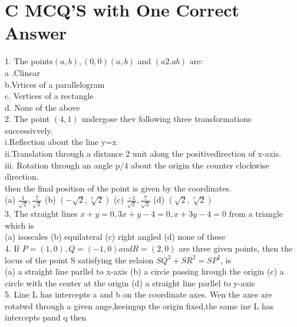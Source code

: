 \documentclass[12pt]{article}
\begin{document}
\section*{C   MCQ'S with One Correct Answer}

1. 	The points$(a,b),(0,0)(a,b)$ and $(a2.ab)$ are:\\
a .Clinear\\
b.Vrtices of a parallelogram\\
c. Vertices of a rectangle\\
d. None of the above\\
2. The point $(4,1)$ undergose thev  following three transformations successivvely.\\
i.Reflection about the line y=x\\
ii.Translation through a distance 2 unit along the positivedirection of x-axis.\\
iii. Rotation through an angle p/4 about the origin the counter clockwise direction.\\
then the final position of the point is given by the coordinates.\\
(a)     $\frac{1}{\sqrt{2}},\frac{7}{\sqrt{2}}$   \hspace{1cm}  (b)     $(-\sqrt{2}, \sqrt[7]{2})$  \hspace{1cm} (c)    $\frac{-1}{\sqrt{2}},\frac{7}{\sqrt{2}}$ \hspace{1cm}(d)     $(\sqrt{2}, \sqrt[7]{2})$\\
3. The straight lines $x+y=0, 3x+y-4=0,x+3y-4=0$ from a triangle which is \\
(a) isoscales \hspace{1cm}   (b) equilateral  \hspace{1cm}  (c)  right angled  \hspace{1cm}  (d)  none of these \\
4. If $P=(1,0), Q=(-1,0) and R=(2,0)$ are three given
points, then  the locus  of the point S satisfying the relaion $SQ^2+SR^2=SP^2$, is\\
(a)  a straight line parllel to x-axis  \hspace{1cm}   (b) a circie passing hrough the origin \hspace{1cm}(c)  a circle with the center at the origin  \hspace{1cm}  (d)  a straight line parllel to y-axis\\
5. Line L has intercepts a and b on the coordinate axes. Wen the axes are rotatwd through a given ange,keeingup the origin fixed,the same ine L has intercepts  pand q then\\
\end{document}
